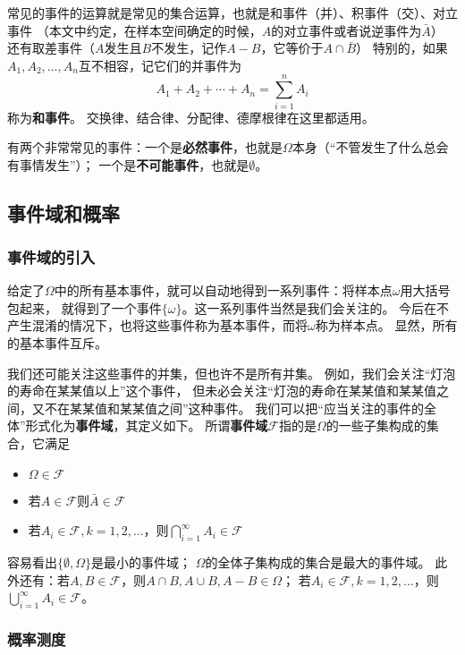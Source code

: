 \documentclass[UTF8, a4paper]{ctexart}
\begin{document}
常见的事件的运算就是常见的集合运算，也就是和事件（并）、积事件（交）、对立事件
（本文中约定，在样本空间确定的时候，$A$的对立事件或者说逆事件为$\bar{A}$）
还有取差事件（$A$发生且$B$不发生，记作$A-B$，它等价于$A \cap \bar{B}$）
特别的，如果$A_1, A_2, \ldots, A_n$互不相容，记它们的并事件为
\[
    A_1 + A_2 + \cdots + A_n = \sum_{i=1}^n A_i
\]
称为\textbf{和事件}。
交换律、结合律、分配律、德摩根律在这里都适用。

有两个非常常见的事件：一个是\textbf{必然事件}，也就是$\Omega$本身（“不管发生了什么总会有事情发生”）；
一个是\textbf{不可能事件}，也就是$\emptyset$。

\subsection{事件域和概率}

\subsubsection{事件域的引入}

给定了$\Omega$中的所有基本事件，就可以自动地得到一系列事件：将样本点$\omega$用大括号包起来，
就得到了一个事件$\{\omega\}$。这一系列事件当然是我们会关注的。
今后在不产生混淆的情况下，也将这些事件称为基本事件，而将$\omega$称为样本点。
显然，所有的基本事件互斥。

我们还可能关注这些事件的并集，但也许不是所有并集。
例如，我们会关注“灯泡的寿命在某某值以上”这个事件，
但未必会关注“灯泡的寿命在某某值和某某值之间，又不在某某值和某某值之间”这种事件。
我们可以把“应当关注的事件的全体”形式化为\textbf{事件域}，其定义如下。
所谓\textbf{事件域}$\mathcal{F}$指的是$\Omega$的一些子集构成的集合，它满足
\begin{itemize}
    \item $\Omega \in \mathcal{F}$
    \item 若$A \in \mathcal{F}$则$\bar{A} \in \mathcal{F}$
    \item 若$A_{i} \in \mathcal{F}, k=1, 2, \ldots$，则$\bigcap_{i=1}^\infty A_i \in \mathcal{F}$
\end{itemize}

容易看出$\{\emptyset, \Omega\}$是最小的事件域；
$\Omega$的全体子集构成的集合是最大的事件域。
此外还有：若$A, B \in \mathcal{F}$，则$A \cap B, A \cup B, A - B \in \Omega$；
若$A_{i} \in \mathcal{F}, k=1, 2, \ldots$，则$\bigcup_{i=1}^\infty A_i \in \mathcal{F}$。

\subsubsection{概率测度}
\end{document}
